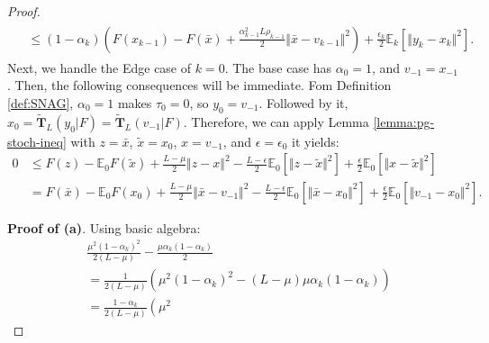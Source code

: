 \documentclass[12pt]{article}
\newcommand{\expect}{\ensuremath{\mathbb E}}
\begin{document}
\begin{proof}
\begin{align}
\begin{split}
                &\le 
                (1 - \alpha_k)\left(
                    F(x_{k - 1}) - F(\bar x)
                    + \frac{\alpha_{k - 1}^2L\rho_{k - 1}}{2}\Vert \bar x - v_{k - 1}\Vert^2
                \right) + \frac{\epsilon_k}{2}\expect_k \left[\Vert y_k - x_k \Vert^2\right]. 
            \end{split}\end{align}
            Next, we handle the Edge case of $k = 0$. 
            The base case has $\alpha_0 = 1$, and $v_{-1} = x_{-1}$. 
            Then, the following consequences will be immediate. 
            Fom Definition \ref{def:SNAG}, $\alpha_0 = 1$ makes $\tau_0 = 0$, so $y_0 = v_{-1}$. 
            Followed by it, $x_0 = \tilde {\mathbf T}_L(y_0 | F) = \widetilde{\mathbf T}_L(v_{-1} | F)$. 
            Therefore, we can apply Lemma \ref{lemma:pg-stoch-ineq} with $z = \bar x$, $\tilde x = x_0$, $x = v_{-1}$, and $\epsilon = \epsilon_0$ it yields: 
            {\small
            \begin{align*}
                0
                &\le 
                F(z) - \expect_0 F(\tilde x)
                + \frac{L - \mu}{2} \Vert z - x\Vert^2
                - \frac{L - \epsilon}{2}\expect_0\left[\Vert z - \tilde x\Vert^2\right]
                + \frac{\epsilon}{2} \expect_0\left[\Vert x - \tilde x\Vert^2\right]
                \\
                &= 
                F(\bar x) - \expect_0 F(x_0)
                + \frac{L - \mu}{2} \Vert \bar x - v_{-1}\Vert^2
                - \frac{L - \epsilon}{2}\expect_0\left[\Vert \bar x - x_0\Vert^2\right]
                + \frac{\epsilon}{2}\expect_0\left[\Vert v_{-1} - x_0\Vert^2\right].
            \end{align*}
            }
            \par \textbf{Proof of (a)}. 
            Using basic algebra: 
            {\allowdisplaybreaks
            \begin{align*}
                & \frac{\mu^2(1 - \alpha_k)^2}{2(L - \mu)} 
                - \frac{\mu\alpha_k(1 - \alpha_k)}{2}
                \\
                &= 
                \frac{1}{2\left(L - \mu\right)}
                \left(
                    \mu^2(1 - \alpha_k)^2
                    - \left(L - \mu\right)\mu \alpha_k(1 - \alpha_k)
                \right)
                \\
                &= \frac{1 - \alpha_k}{2\left(L - \mu\right)}\left(
                    \mu^2 

\end{align*}}
\end{proof}
\end{document}
